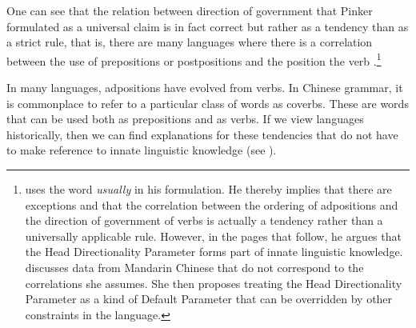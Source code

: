 One can see that the relation between direction of government that Pinker formulated as a universal
claim is in fact correct but rather as a tendency than as a strict rule, that is, there are many languages where
there is a correlation between the use of prepositions or postpositions and the position the verb
\citep[]{Dryer92a}.\footnote{
\citet[]{Pinker94a} uses the word \emph{usually} in his formulation. He thereby implies
that there are exceptions and that the correlation between the ordering of adpositions and the
direction of government of verbs is actually a tendency rather than
a universally applicable rule. However, in the pages that follow, he argues that the Head Directionality Parameter forms part of innate linguistic knowledge.
\citet[]{Travis84a-u} discusses data from Mandarin Chinese that do not correspond to the correlations she assumes. She then proposes treating the Head Directionality Parameter
as a kind of Default Parameter that can be overridden by other constraints in the language.
} 

In many languages, adpositions have evolved from verbs. In Chinese grammar, it is commonplace to refer to a particular class of words as coverbs.
These are words that can be used both as prepositions and as verbs. If we view languages historically, then we can find explanations for these tendencies that do not have to make
reference to innate linguistic knowledge (see \citealp[]{EL2009a}). 


